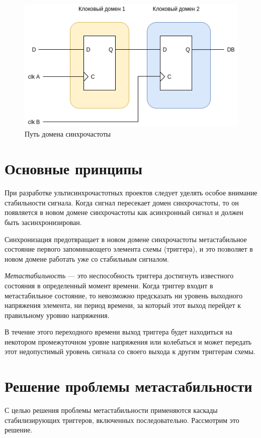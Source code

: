 \begin{figure}[h!]
	\centering
	\includegraphics[width=0.7\linewidth]{course-scheme/images/multiclock-domain}
	\caption{Путь домена синхрочастоты}
	\label{fig:multiclock-domain}
\end{figure}


\section{Основные принципы}

При разработке ультисинхрочастотных проектов следует уделять особое внимание стабильности сигнала. Когда сигнал пересекает домен синхрочастоты, то он появляется в новом домене синхрочастоты как асинхронный сигнал и должен быть засинхронизирован.

Синхронизация предотвращает в новом домене синхрочастоты метастабильное состояние первого запоминающего элемента схемы (триггера), и это позволяет в новом домене работать уже со стабильным сигналом.

\textit{Метастабильность} --- это неспособность триггера достигнуть известного состояния в определенный момент времени. Когда триггер входит в метастабильное состояние, то невозможно предсказать ни уровень выходного напряжения элемента, ни период времени, за который этот выход перейдет к правильному уровню напряжения. 

В течение этого переходного времени выход триггера будет находиться на некотором промежуточном уровне напряжения или колебаться и может передать этот недопустимый уровень сигнала со своего выхода к другим триггерам схемы.

\section{Решение проблемы метастабильности}

С целью решения проблемы метастабильности применяются каскады стабилизирующих триггеров, включенных последовательно. Рассмотрим это решение.



